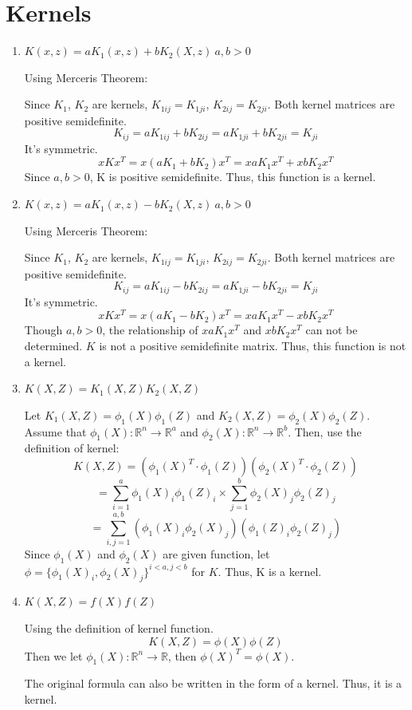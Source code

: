 \documentclass[a4paper, 12pt, titlepage]{article}
\begin{document}
\section{Kernels}
\begin{enumerate}
    \item $K(x,z) = aK_1(x,z) + bK_2(X,z)~ a,b>0$

        Using Merceris Theorem:

        Since $K_1$, $K_2$ are kernels, $K_{1ij} = K_{1ji}$, $K_{2ij} = K_{2ji}$. Both kernel matrices are positive semidefinite.
        $$K_{ij} = aK_{1ij} + bK_{2ij} = aK_{1ji} + bK_{2ji} = K_{ji}$$ It's symmetric.
        $$xKx^T = x(aK_1+bK_2)x^T=xaK_1x^T + xbK_2x^T$$
        Since $a,b>0$, K is positive semidefinite.
        Thus, this function is a kernel.
        
    \item $K(x,z) = aK_1(x,z) - bK_2(X,z)~ a,b>0$

        Using Merceris Theorem:

        Since $K_1$, $K_2$ are kernels, $K_{1ij} = K_{1ji}$, $K_{2ij} = K_{2ji}$. Both kernel matrices are positive semidefinite.
        $$K_{ij} = aK_{1ij} - bK_{2ij} = aK_{1ji} - bK_{2ji} = K_{ji}$$ It's symmetric.
        $$xKx^T = x(aK_1-bK_2)x^T=xaK_1x^T - xbK_2x^T$$
        Though $a,b>0$, the relationship of $xaK_1x^T$ and $xbK_2x^T$ can not be determined. $K$ is not a positive semidefinite matrix. Thus, this function is not a kernel.

    \item $K(X,Z) = K_1(X,Z)K_2(X,Z)$

        Let $K_1(X,Z) = \phi_1(X)\phi_1(Z)$ and $K_2(X,Z) = \phi_2(X)\phi_2(Z)$.
        Assume that $\phi_1(X): \mathbb{R}^n\rightarrow \mathbb{R}^a$ and $\phi_2(X): \mathbb{R}^n\rightarrow \mathbb{R}^b$.
        Then, use the definition of kernel:
        $$K(X,Z)=(\phi_1(X)^T\cdot\phi_1(Z))(\phi_2(X)^T\cdot\phi_2(Z))$$
        $$=\sum_{i=1}^a\phi_1(X)_i\phi_1(Z)_i\times\sum_{j=1}^b\phi_2(X)_j\phi_2(Z)_j$$
        $$=\sum_{i,j=1}^{a,b}(\phi_1(X)_i\phi_2(X)_j)(\phi_1(Z)_i\phi_2(Z)_j)$$
        Since $\phi_1(X)$ and $\phi_2(X)$ are given function, let $\phi=\{\phi_1(X)_i, \phi_2(X)_j\}^{i<a,j<b}$ for $K$. Thus, K is a kernel.

    \item $K(X,Z) = f(X)f(Z)$

        Using the definition of kernel function.
        $$K(X,Z) = \phi(X)\phi(Z)$$
        Then we let $\phi_1(X): \mathbb{R}^n\rightarrow \mathbb{R}$, then $\phi(X)^T=\phi(X)$.
        
        The original formula can also be written in the form of a kernel. Thus, it is a kernel.

\end{enumerate}
\end{document}
